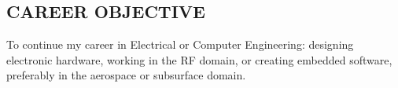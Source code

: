 \documentclass[line,mmmargin]{res}
\begin{document}
\setlength\columnsep{-30pt}
\address{56 South St.}
\address{Drury MA, 01343}
\website{}
 
\begin{resume}
 \setlength\multicolsep{2pt}

\section{CAREER OBJECTIVE}   
	To continue my career in Electrical or Computer Engineering: 
	designing electronic hardware, working in the RF domain, or creating 
	embedded software, preferably in the aerospace or subsurface domain.
 

\end{resume}
\end{document}
